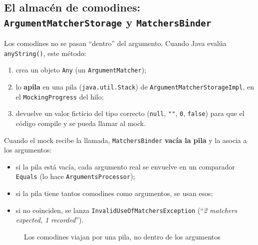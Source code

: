 \documentclass[11pt,a4paper,oneside]{report}
\newcommand{\code}[1]{\texttt{#1}}
\begin{document}
\subsection{El almacén de comodines: \code{ArgumentMatcherStorage} y \code{MatchersBinder}}
Los comodines no se pasan ``dentro'' del argumento. Cuando Java evalúa \code{anyString()}, este método:
\begin{enumerate}
  \item crea un objeto \code{Any} (un \code{ArgumentMatcher});
  \item lo \textbf{apila} en una pila (\code{java.util.Stack}) de \code{ArgumentMatcherStorageImpl}, en el \code{MockingProgress} del hilo;
  \item devuelve un valor ficticio del tipo correcto (\code{null}, \code{""}, \code{0}, \code{false}) para que el código compile y se pueda llamar al mock.
\end{enumerate}
Cuando el mock recibe la llamada, \code{MatchersBinder} \textbf{vacía la pila} y la asocia a los argumentos:
\begin{itemize}
  \item si la pila está vacía, cada argumento real se envuelve en un comparador \code{Equals} (lo hace \code{ArgumentsProcessor});
  \item si la pila tiene tantos comodines como argumentos, se usan esos;
  \item si no coinciden, se lanza \code{InvalidUseOfMatchersException} (``\emph{2 matchers expected, 1 recorded}'').
\end{itemize}

\begin{figure}[H]
\centering
{}
\caption{Los comodines viajan por una pila, no dentro de los argumentos}
\end{figure}
\end{document}
